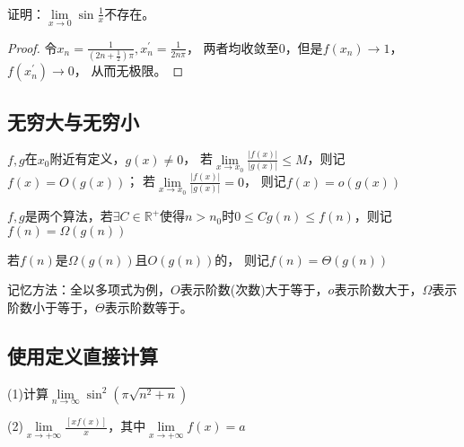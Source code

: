 ~

\begin{exercise}[用归结原则证明不收敛]
  证明：$\lim \limits _{x \rightarrow 0} \sin \frac{1}{x}$不存在。
\end{exercise}

\begin{proof}
  令$x_n = \frac{1}{(2n + \frac{1}{2}) \pi}, x_n^{\prime} = \frac{1}{2n \pi}$，
  两者均收敛至$0$，但是$f(x_n) \rightarrow 1$，$f(x_n^{\prime}) \rightarrow 0$，
  从而无极限。
\end{proof}




\subsection{无穷大与无穷小}

\begin{definition}[O与o]
  $f,g$在$x_0$附近有定义，$g(x) \neq 0$，
  若$\lim \limits _{x \rightarrow x_0} \frac{|f(x)|}{|g(x)|} \leq M$，则记$f(x) = O(g(x))$；
  若$\lim \limits _{x \rightarrow x_0} \frac{|f(x)|}{|g(x)|} = 0$，
  则记$f(x) = o(g(x))$
\end{definition}

\begin{definition}[$\Omega$]
  $f,g$是两个算法，若$\exists C \in \mathbb{R}^+$使得$n > n_0$时$0 \leq Cg(n) \leq f(n)$，则记$f(n) = \Omega(g(n))$
\end{definition}

\begin{definition}[$\Theta$]
  若$f(n)$是$\Omega(g(n))$且$O(g(n))$的，
  则记$f(n) = \Theta(g(n))$
\end{definition}

\begin{note}
  记忆方法：全以多项式为例，$O$表示阶数(次数)大于等于，$o$表示阶数大于，$\Omega$表示阶数小于等于，$\Theta$表示阶数等于。
\end{note}


\subsection{使用定义直接计算}

\begin{exercise}[几个经典函数极限]
  (1)计算$\lim \limits _{n \rightarrow \infty} \sin^2(\pi \sqrt{n^2 + n})$

  (2)$\lim \limits _{x \rightarrow +\infty}\frac{[xf(x)]}{x}$，其中$\lim \limits _{x \rightarrow +\infty}f(x) = a$
\end{exercise}

